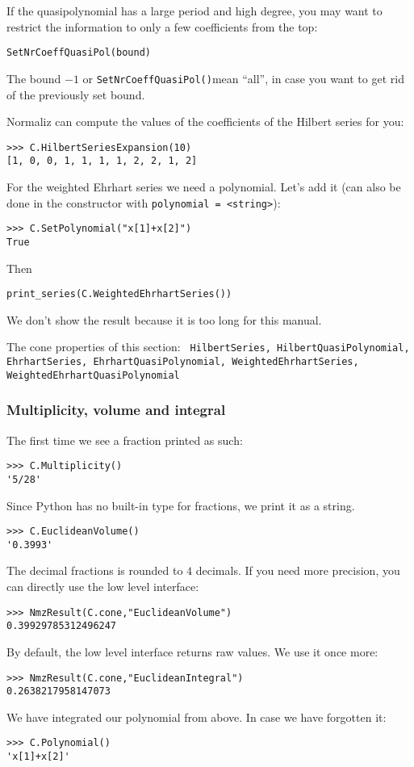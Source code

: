 \documentclass[12pt,a4paper]{scrartcl}
\theoremstyle{definition}
\def\ttt{\texttt}
\begin{document}
\begin{small}
If the quasipolynomial has a large period and high degree, you may want to restrict the information to only a few coefficients from the top:
\begin{Verbatim}
SetNrCoeffQuasiPol(bound)
\end{Verbatim}
The bound $-1$ or \verb|SetNrCoeffQuasiPol()|mean ``all'', in case you want to get rid of the previously set bound.

Normaliz can compute the values of the coefficients of the Hilbert series for you:
\begin{Verbatim}
>>> C.HilbertSeriesExpansion(10)
[1, 0, 0, 1, 1, 1, 1, 2, 2, 1, 2]
\end{Verbatim}

For the weighted Ehrhart series we need a polynomial. Let's add it (can also be done in the constructor with \verb|polynomial = <string>|):
\begin{Verbatim}
>>> C.SetPolynomial("x[1]+x[2]")
True
\end{Verbatim}
Then
\begin{Verbatim}
print_series(C.WeightedEhrhartSeries())
\end{Verbatim}
We don't show the result because it is too long for this manual.

The cone properties of this section: \ttt{    HilbertSeries,
	HilbertQuasiPolynomial,
	EhrhartSeries,
	EhrhartQuasiPolynomial,
	WeightedEhrhartSeries,
	WeightedEhrhartQuasiPolynomial}

\subsubsection{Multiplicity, volume and integral}
The first time we see a fraction printed as such:
\begin{Verbatim}
>>> C.Multiplicity()
'5/28'
\end{Verbatim}
Since Python has no built-in type for fractions, we print it as a string.

\begin{Verbatim}
>>> C.EuclideanVolume()
'0.3993'
\end{Verbatim}
The decimal fractions is rounded to $4$ decimals. If you need more precision, you can directly use the low level interface:
\begin{Verbatim}
>>> NmzResult(C.cone,"EuclideanVolume")
0.39929785312496247
\end{Verbatim}
By default, the low level interface returns raw values. We use it once more:
\begin{Verbatim}
>>> NmzResult(C.cone,"EuclideanIntegral")
0.2638217958147073
\end{Verbatim}
We have integrated our polynomial from above. In case we have forgotten it:
\begin{Verbatim}
>>> C.Polynomial()
'x[1]+x[2]'
\end{Verbatim}


\end{small}
\end{document}
